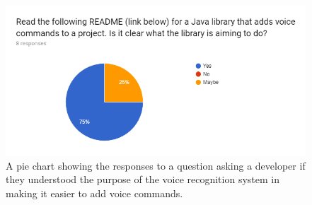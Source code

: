 \documentclass[11pt]{article}
\begin{document}
\begin{center}
\begin{figure}[H]
\begin{center}
  \includegraphics[width=\linewidth]{survey-readme}
  \caption{A pie chart showing the responses to a question asking a developer if they understood the purpose of the voice recognition system in making it easier to add voice commands.}
  \label{fig:survey-readme}
  \end{center}
\end{figure}
\end{center}

\newpage
{}

\end{document}
